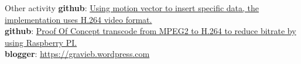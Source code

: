 \documentclass{resume}
\begin{document}
  \begin{rSection}{Other activity}
    {\bf github}: \href{https://github.com/truongpt/video_watermarking}{Using motion vector to insert specific data, the implementation uses H.264 video format.} \\
    {\bf github}: \href{https://github.com/truongpt/omxtranscoder}{Proof Of Concept transcode from MPEG2 to H.264 to reduce bitrate by using Raspberry PI.}  \\
    {\bf blogger}: \href{https://gravieb.wordpress.com/}{https://gravieb.wordpress.com} \\

  \end{rSection}
\end{document}
